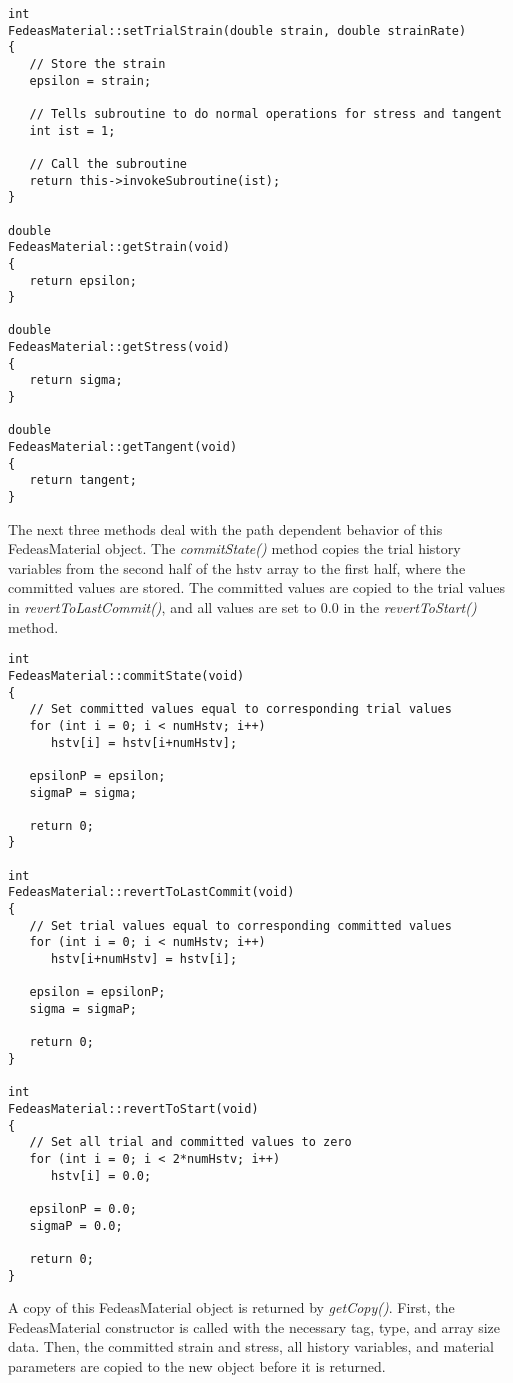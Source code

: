 \documentclass[12pt]{article}
\begin{document}
{\sf\small
\begin{verbatim}
int
FedeasMaterial::setTrialStrain(double strain, double strainRate)
{
   // Store the strain
   epsilon = strain;
     
   // Tells subroutine to do normal operations for stress and tangent
   int ist = 1;
     
   // Call the subroutine
   return this->invokeSubroutine(ist);
}

double
FedeasMaterial::getStrain(void)
{
   return epsilon;
}

double
FedeasMaterial::getStress(void)
{
   return sigma;
}

double
FedeasMaterial::getTangent(void)
{
   return tangent;
}
\end{verbatim}
}

\noindent The next three methods deal with the path dependent behavior of this
FedeasMaterial object. The {\em commitState()} method copies the trial history variables
from the second half of the hstv array to the first half, where the committed values are
stored. The committed values are copied to the trial values in {\em revertToLastCommit()},
and all values are set to $0.0$ in the {\em revertToStart()} method.

{\sf\small
\begin{verbatim}
int
FedeasMaterial::commitState(void)
{
   // Set committed values equal to corresponding trial values
   for (int i = 0; i < numHstv; i++)
      hstv[i] = hstv[i+numHstv];
     
   epsilonP = epsilon;
   sigmaP = sigma;
     
   return 0;
}

int
FedeasMaterial::revertToLastCommit(void)
{
   // Set trial values equal to corresponding committed values
   for (int i = 0; i < numHstv; i++)
      hstv[i+numHstv] = hstv[i];
     
   epsilon = epsilonP;
   sigma = sigmaP;
     
   return 0;
}

int
FedeasMaterial::revertToStart(void)
{
   // Set all trial and committed values to zero
   for (int i = 0; i < 2*numHstv; i++)
      hstv[i] = 0.0;
     
   epsilonP = 0.0;
   sigmaP = 0.0;
     
   return 0;
}
\end{verbatim}
}

\noindent A copy of this FedeasMaterial object is returned by {\em getCopy()}. First, the
FedeasMaterial constructor is called with the necessary tag, type, and array size data.
Then, the committed strain and stress, all history variables, and material parameters
are copied to the new object before it is returned.
\end{document}
